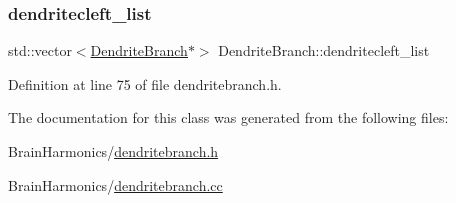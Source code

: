 \subsubsection{\texorpdfstring{dendritecleft\+\_\+list}{dendritecleft\_list}}
{\footnotesize\ttfamily std\+::vector$<$\hyperlink{class_dendrite_branch}{Dendrite\+Branch}$\ast$$>$ Dendrite\+Branch\+::dendritecleft\+\_\+list\hspace{0.3cm}{\ttfamily [protected]}}



Definition at line 75 of file dendritebranch.\+h.



The documentation for this class was generated from the following files\+:\begin{DoxyCompactItemize}
\item 
Brain\+Harmonics/\hyperlink{dendritebranch_8h}{dendritebranch.\+h}\item 
Brain\+Harmonics/\hyperlink{dendritebranch_8cc}{dendritebranch.\+cc}\end{DoxyCompactItemize}
